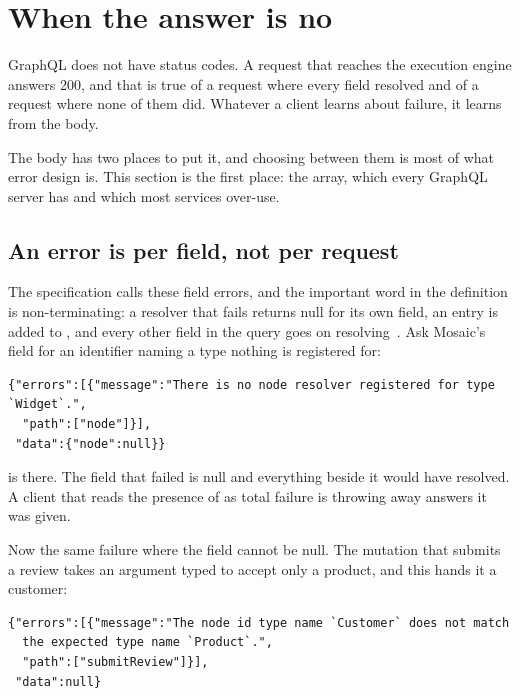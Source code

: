 \section{When the answer is no}
\label{sec:ch05-when-the-answer-is-no}

GraphQL does not have status codes. A request that reaches the execution engine
answers 200, and that is true of a request where every field resolved and of a
request where none of them did. Whatever a client learns about failure, it
learns from the body.

The body has two places to put it, and choosing between them is most of what
error design is. This section is the first place: the  array,
which every GraphQL server has and which most services over-use.

\subsection*{An error is per field, not per request}

%
The specification calls these field errors, and the important word in the
definition is non-terminating: a resolver that fails returns null for its own
field, an entry is added to , and every other field in the query
goes on resolving~\autocite{chillicream2026errors}. Ask Mosaic's 
field for an identifier naming a type nothing is registered for:

\begin{verbatim}
{"errors":[{"message":"There is no node resolver registered for type `Widget`.",
  "path":["node"]}],
 "data":{"node":null}}
\end{verbatim}

 is there. The field that failed is null and everything beside it
would have resolved. A client that reads the presence of  as total
failure is throwing away answers it was given.

%
Now the same failure where the field cannot be null. The mutation that submits a
review takes an argument typed to accept only a product, and this hands it a
customer:

\begin{verbatim}
{"errors":[{"message":"The node id type name `Customer` does not match
  the expected type name `Product`.",
  "path":["submitReview"]}],
 "data":null}
\end{verbatim}

